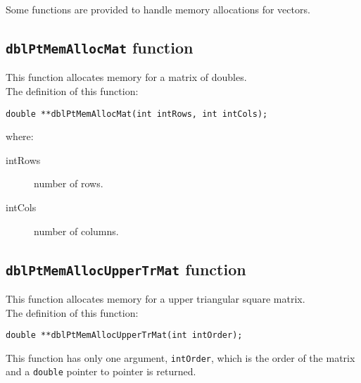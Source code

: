 Some functions are provided to handle memory allocations for vectors.

\subsection{\texttt{dblPtMemAllocMat} function} \label{sec:dblPtMemAllocMat}

This function allocates memory for a matrix of doubles.\\

The definition of this function:
%
\begin{verbatim}
double **dblPtMemAllocMat(int intRows, int intCols);
\end{verbatim}
%
where:
%
\begin{description}
\item[intRows] number of rows.
\item[intCols] number of columns.
\end{description}

\subsection{\texttt{dblPtMemAllocUpperTrMat} function} \label{sec:dblPtMemAllocUpperTrMat}

This function allocates memory for a upper triangular square matrix.\\

The definition of this function:
%
\begin{verbatim}
double **dblPtMemAllocUpperTrMat(int intOrder);
\end{verbatim}

This function has only one argument, \texttt{intOrder}, which is the order of the matrix and a \texttt{double} pointer to pointer is returned.\\

